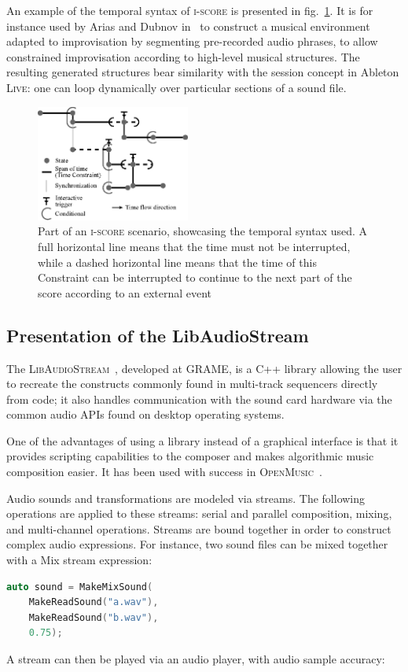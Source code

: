 \documentclass{article}
\newcommand*{\LibAudioStream}{\textsc{LibAudioStream}\xspace}
\newcommand*{\iscore}{\textsc{i-score}\xspace}
\newcommand*{\abletonlive}{Ableton \textsc{Live}\xspace}
\newcommand*{\openmusic}{\textsc{OpenMusic}\xspace}
\begin{document}
An example of the temporal syntax of \iscore is presented in fig.~\ref{fig.iscore-example}.
It is for instance used by Arias and Dubnov in~\cite{Arias:VMO-Score} to construct a musical environment adapted to improvisation by segmenting pre-recorded audio phrases, to allow constrained improvisation according to high-level musical structures.
The resulting generated structures bear similarity with the session concept in \abletonlive: one can loop dynamically over particular sections of a sound file. 

\begin{figure}
	\centering
	\includegraphics[width=0.45\textwidth]{figures/iscore-example.eps}
	\caption{Part of an \iscore scenario, showcasing the temporal syntax used. 
		A full horizontal line means that the time must not be interrupted, 
		while a dashed horizontal line means that the time of this Constraint can be interrupted to continue 
		to the next part of the score according to an external event}
	\label{fig.iscore-example}
\end{figure}

\subsection{Presentation of the LibAudioStream}
The \LibAudioStream~\cite{letzlibaudiostream}, developed at GRAME, is a C++ library allowing the user to recreate the constructs commonly found in multi-track sequencers directly from code; it also handles communication with the sound card hardware via the common audio APIs found on desktop operating systems.

One of the advantages of using a library instead of a graphical interface is that it provides scripting capabilities to the composer and makes algorithmic music composition easier.
It has been used with success in \openmusic~\cite{bouche2014programmation}.

Audio sounds and transformations are modeled via streams. 
The following operations are applied to these streams: serial and parallel composition, mixing, and multi-channel operations.
Streams are bound together in order to construct complex audio expressions.
For instance, two sound files can be mixed together with a Mix stream expression: 
\begin{lstlisting}[language=C++,columns=fullflexible,basicstyle=\ttfamily]
auto sound = MakeMixSound(
    MakeReadSound("a.wav"), 
    MakeReadSound("b.wav"), 
    0.75);
\end{lstlisting}
A stream can then be played via an audio player, with audio sample accuracy:
 
\end{document}
